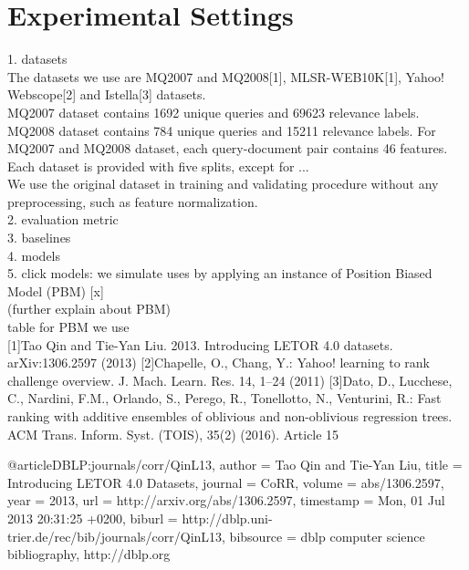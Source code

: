 \section{Experimental Settings}



1. datasets\\
The datasets we use are MQ2007 and MQ2008[1], MLSR-WEB10K[1], Yahoo! Webscope[2] and Istella[3] datasets.\\
MQ2007 dataset contains 1692 unique queries and 69623 relevance labels. MQ2008 dataset contains 784 unique queries and 15211 relevance labels. For MQ2007 and MQ2008 dataset, each query-document pair contains 46 features.\\
Each dataset is provided with five splits, except for ...\\
We use the original dataset in training and validating procedure without any preprocessing, such as feature normalization.\\
2. evaluation metric\\
3. baselines\\
4. models\\
5. click models: we simulate uses by applying an instance of Position Biased Model (PBM) [x]\\
(further explain about PBM)\\
table for PBM we use\\

[1]Tao Qin and Tie-Yan Liu. 2013. Introducing LETOR 4.0 datasets. arXiv:1306.2597 (2013)
[2]Chapelle, O., Chang, Y.: Yahoo! learning to rank challenge overview. J. Mach. Learn. Res. 14, 1–24 (2011)
[3]Dato, D., Lucchese, C., Nardini, F.M., Orlando, S., Perego, R., Tonellotto, N., Venturini, R.: Fast ranking with additive ensembles of oblivious and non-oblivious regression trees. ACM Trans. Inform. Syst. (TOIS), 35(2) (2016). Article 15

@article{DBLP:journals/corr/QinL13,
	author    = {Tao Qin and
		Tie{-}Yan Liu},
	title     = {Introducing {LETOR} 4.0 Datasets},
	journal   = {CoRR},
	volume    = {abs/1306.2597},
	year      = {2013},
	url       = {http://arxiv.org/abs/1306.2597},
	timestamp = {Mon, 01 Jul 2013 20:31:25 +0200},
	biburl    = {http://dblp.uni-trier.de/rec/bib/journals/corr/QinL13},
	bibsource = {dblp computer science bibliography, http://dblp.org}
}